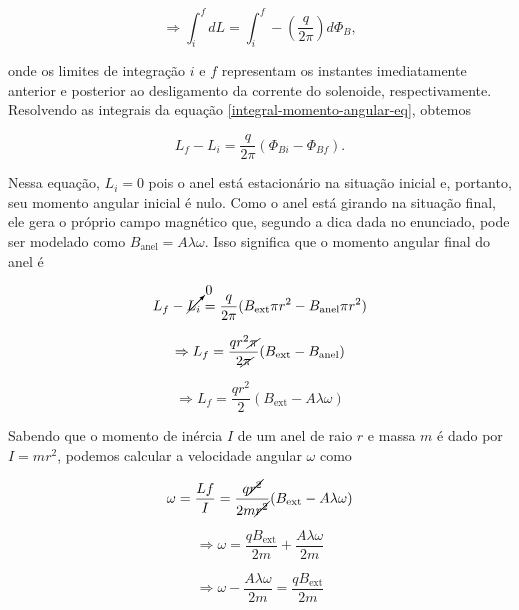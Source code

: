 \documentclass[
	article,
	11pt,
	oneside,
	a4paper,
	english,
	brazil,
	sumario=tradicional
	]{abntex2}
\begin{document}
\begin{equation} \label{integral-momento-angular-eq}
    \Rightarrow \int_i^f dL = \int_i^f - \left(\frac{q}{2\pi}\right) d\Phi_B,
\end{equation}

\noindent onde os limites de integração $i$ e $f$ representam os instantes imediatamente anterior e posterior ao desligamento da corrente do solenoide, respectivamente. Resolvendo as integrais da equação \ref{integral-momento-angular-eq}, obtemos

\begin{equation}
    L_f - L_i = \frac{q}{2\pi}(\Phi_{Bi} - \Phi_{Bf}).
\end{equation}

Nessa equação, $L_i = 0$ pois o anel está estacionário na situação inicial e, portanto, seu momento angular inicial é nulo. Como o anel está girando na situação final, ele gera o próprio campo magnético que, segundo a dica dada no enunciado, pode ser modelado como $B_{\text{anel}} = A\lambda\omega$. Isso significa que o momento angular final do anel é

\begin{equation}
    L_f - \cancelto{0}{L_i}= \frac{q}{2\pi}(B_{\text{ext}}\pi r^2 - B_{\text{anel}} \pi r^2)
\end{equation}

\begin{equation}
    \Rightarrow L_f = \frac{q r^2 \cancel{\pi}}{2\cancel{\pi}} (B_{\text{ext}} - B_{\text{anel}})
\end{equation}

\begin{equation}
    \Rightarrow L_f = \frac{q r^2}{2} (B_{\text{ext}} - A\lambda\omega)
\end{equation}

Sabendo que o momento de inércia $I$ de um anel de raio $r$ e massa $m$ é dado por $I = mr^2$, podemos calcular a velocidade angular $\omega$ como

\begin{equation}
    \omega = \frac{Lf}{I} = \frac{q \cancel{r^2}}{2m \cancel{r^2}}(B_{\text{ext}} - A\lambda\omega)
\end{equation}

\begin{equation}
    \Rightarrow \omega = \frac{qB_{\text{ext}}}{2m} + \frac{A\lambda\omega}{2m}
\end{equation}

\begin{equation}
    \Rightarrow \omega - \frac{A\lambda\omega}{2m} = \frac{qB_{\text{ext}}}{2m}
\end{equation}
\end{document}
